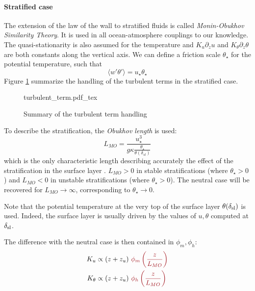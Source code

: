 \paragraph{Stratified case}
The extension of the law of the wall to stratified
fluids is called \textit{Monin-Obukhov Similarity Theory}.
It is used in all ocean-atmosphere couplings to our knowledge.
The quasi-stationarity is also assumed for the temperature
and $K_u \partial_z u$ and $K_\theta \partial_z \theta$
are both constants along the vertical axis.
We can define a friction scale $\theta_\star$
for the potential temperature, such that
\begin{equation}
	\langle w' \theta' \rangle = u_\star \theta_\star
\end{equation}
Figure \ref{fig:airseaSCM_turbulentTermHandling} summarize the
handling of the turbulent terms in the stratified case.
\begin{figure}
	\centering
	{turbulent_term.pdf_tex}
	\caption{Summary of the turbulent term handling}
	\label{fig:airseaSCM_turbulentTermHandling}
\end{figure}
To describe the stratification, the \textit{Obukhov length}
is used:
\begin{equation}
	L_{MO} = \frac{u_\star^3}{g \kappa
	\frac{\theta_\star}{\theta(\delta_{sl})}}
\end{equation}
which is the only characteristic length describing
accurately the effect of the stratification in
the surface layer \citep{obukhov_turbulence_1946}.
$L_{MO}>0$ in stable stratifications
(where $\theta_\star>0$)
and $L_{MO}<0$ in unstable stratifications
(where $\theta_\star>0$).
The neutral case will be recovered
for $L_{MO} \rightarrow \infty$, corresponding
to $\theta_\star \rightarrow 0$.
\par
Note that the potential temperature at the very top of the surface
layer $\theta(\delta_{\rm sl})$ is used. Indeed, the surface layer is
usually driven by the values of $u, \theta$
computed at $\delta_{\rm sl}$.
\par
The difference with the neutral case is then contained
in  $\phi_m, \phi_h$:
\begin{equation}
\begin{aligned}
	K_u &\propto (z+z_u)~
	\emphase{\phi_m\left(\frac{z}{L_{MO}}\right)} \\
	K_\theta &\propto (z+z_u)~
	\emphase{\phi_h\left(\frac{z}{L_{MO}}\right)}
\end{aligned}
\end{equation}
